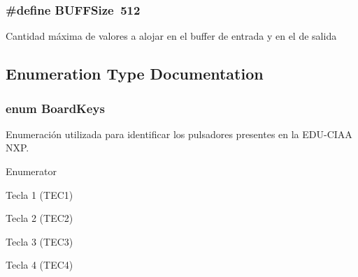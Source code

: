 \subsubsection[{\texorpdfstring{B\+U\+F\+F\+Size}{BUFFSize}}]{\setlength{\rightskip}{0pt plus 5cm}\#define B\+U\+F\+F\+Size~512}\hypertarget{group__operaciones_ga571c3b0aaee2fe73b34cb9a7e26de731}{}\label{group__operaciones_ga571c3b0aaee2fe73b34cb9a7e26de731}
Cantidad máxima de valores a alojar en el buffer de entrada y en el de salida 

\subsection{Enumeration Type Documentation}
\subsubsection[{\texorpdfstring{Board\+Keys}{BoardKeys}}]{\setlength{\rightskip}{0pt plus 5cm}enum {\bf Board\+Keys}}\hypertarget{group__operaciones_gac4035d04f315e3484218600aa1c52f44}{}\label{group__operaciones_gac4035d04f315e3484218600aa1c52f44}


Enumeración utilizada para identificar los pulsadores presentes en la E\+D\+U-\/\+C\+I\+AA N\+XP. 

\begin{Desc}
\item[Enumerator]\par
\begin{description}
\item[{\em 
Key1\hypertarget{group__operaciones_ggac4035d04f315e3484218600aa1c52f44a5512d17c3218596367fffdc9bba5d772}{}\label{group__operaciones_ggac4035d04f315e3484218600aa1c52f44a5512d17c3218596367fffdc9bba5d772}
}]Tecla 1 (T\+E\+C1) \item[{\em 
Key2\hypertarget{group__operaciones_ggac4035d04f315e3484218600aa1c52f44a4e2947c4588f93871e3321d6ed8b29ad}{}\label{group__operaciones_ggac4035d04f315e3484218600aa1c52f44a4e2947c4588f93871e3321d6ed8b29ad}
}]Tecla 2 (T\+E\+C2) \item[{\em 
Key3\hypertarget{group__operaciones_ggac4035d04f315e3484218600aa1c52f44ade464c5536012794d0bf75930adf611a}{}\label{group__operaciones_ggac4035d04f315e3484218600aa1c52f44ade464c5536012794d0bf75930adf611a}
}]Tecla 3 (T\+E\+C3) \item[{\em 
Key4\hypertarget{group__operaciones_ggac4035d04f315e3484218600aa1c52f44aebb65f93ed25e808a5bfe10034f44e57}{}\label{group__operaciones_ggac4035d04f315e3484218600aa1c52f44aebb65f93ed25e808a5bfe10034f44e57}
}]Tecla 4 (T\+E\+C4) \end{description}
\end{Desc}


